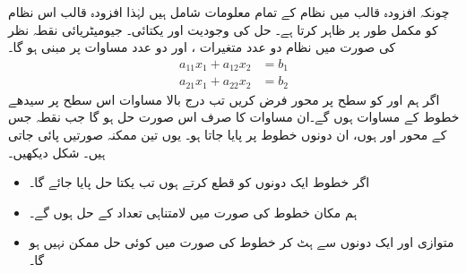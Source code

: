 چونکہ افزودہ قالب میں نظام  کے تمام معلومات شامل ہیں لہٰذا افزودہ قالب اس نظام کو مکمل طور پر ظاہر کرتا ہے۔
\quad حل کی وجودیت اور یکتائی۔ جیومیٹریائی نقطہ نظر\\
 کی صورت میں نظام دو عدد متغیرات ،  اور دو عدد مساوات پر مبنی ہو گا۔
\begin{align*}
a_{11}x_1+a_{12}x_2&=b_1\\
a_{21}x_1+a_{22}x_2&=b_2
\end{align*}
اگر ہم  اور   کو سطح  پر محور فرض کریں تب درج بالا مساوات اس سطح پر سیدھے خطوط کے مساوات ہوں گے۔ان مساوات کا صرف اس صورت حل  ہو گا جب نقطہ  جس کے محور  اور  ہوں، ان دونوں خطوط پر پایا جاتا ہو۔ یوں تین ممکنہ صورتیں پائی جاتی ہیں۔ شکل  دیکھیں۔
\begin{itemize}
\item
اگر خطوط ایک دونوں کو قطع کرتے ہوں تب یکتا حل پایا جائے گا۔
\item
ہم مکان خطوط کی صورت میں لامتناہی تعداد کے حل ہوں گے۔
\item
متوازی اور ایک دونوں سے ہٹ کر خطوط کی صورت میں کوئی حل ممکن نہیں ہو گا۔
\end{itemize}
%

